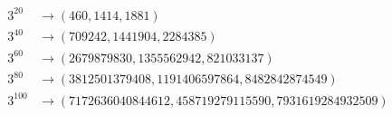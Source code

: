 \documentclass[11pt]{article}
\begin{document}
\begin{equation*}
\begin{split}
3^{20}  &\rightarrow (460, 1414, 1881) \\
3^{40}  &\rightarrow (709242, 1441904, 2284385) \\
3^{60}  &\rightarrow (2679879830, 1355562942, 821033137) \\
3^{80}  &\rightarrow (3812501379408, 1191406597864, 8482842874549) \\
3^{100}  &\rightarrow (7172636040844612, 458719279115590, 7931619284932509) \\
\end{split}
\end{equation*}
\end{document}
